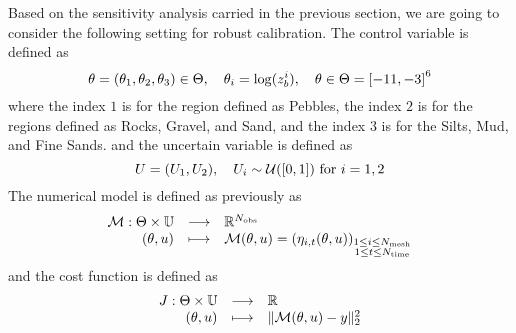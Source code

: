\documentclass[../../Main_ManuscritThese.tex]{subfiles}
\newcommand{\zob}{z_b}
\begin{document}
Based on the sensitivity analysis carried in the previous section, we
are going to consider the following setting for robust calibration.
The control variable is defined as
\begin{equation}
  \kk=\left(\kk_1,\kk_2,\kk_3\right) \in \Kspace, \quad \kk_i = \log(\zob^i), \quad \KK \in \Kspace = \interval{-11}{-3}^6
  \end{equation}
  where the index $1$ is for the region defined as Pebbles, the index $2$ is for the regions defined as Rocks, Gravel, and Sand, and the index $3$ is for the Silts, Mud, and Fine Sands.
and the uncertain variable is defined as
\begin{equation}
  \UU = (\UU_1,\UU_2), \quad \UU_i \sim \mathcal{U}(\interval{0}{1}) \text{ for } i=1,2
\end{equation}
The numerical model is defined as previously as
\begin{equation}
  \begin{array}{rcl}
    \mathcal{M}: \Theta \times \mathbb{U} &\longrightarrow& \mathbb{R}^{N_{\mathrm{obs}}} \\
    (\theta, u)& \longmapsto & \mathcal{M}(\theta, u) = \left(\eta_{i,t}(\theta, u)\right)_{\substack{1 \leq i \leq N_{\mathrm{mesh}} \\ 1 \leq t \leq N_{\mathrm{time}}}} \\ 
  \end{array}
\end{equation}
and the cost function is defined as
\begin{equation}
  \begin{array}{rcl}
    J: \Theta \times \mathbb{U} & \longrightarrow & \mathbb{R} \\
    (\theta, u) & \longmapsto & \|\mathcal{M}(\theta, u) - y \|^2_2
  \end{array}
\end{equation}
\end{document}
